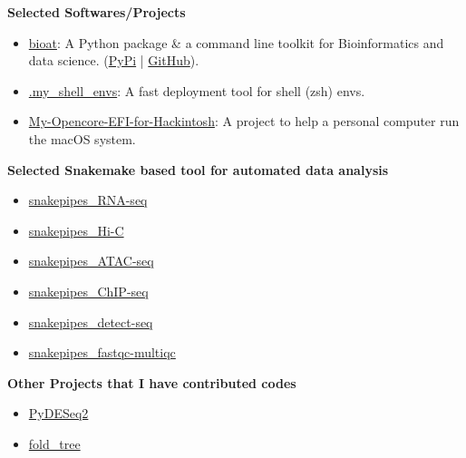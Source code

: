 \textbf{Selected Softwares/Projects}
\begin{itemize}
    \item \href{https://github.com/hermanzhaozzzz/bioat}{bioat}: A Python package \& a command line toolkit for Bioinformatics and data science. (\href{https://pypi.org/project/bioat/}{PyPi} | \href{https://github.com/hermanzhaozzzz/bioat}{GitHub}).
    \item \href{https://github.com/hermanzhaozzzz/.my_shell_envs}{.my\_shell\_envs}: A fast deployment tool for shell (zsh) envs.
    \item \href{https://github.com/hermanzhaozzzz/My-Opencore-EFI-for-AMD3900X-5700XT-TUF-x570-Hackintosh}{My-Opencore-EFI-for-Hackintosh}: A project to help a personal computer run the macOS system.
\end{itemize}

\textbf{Selected Snakemake based tool for automated data analysis}
\vspace{-1em}
\begin{multicols}{3} %
\begin{itemize}
    \item \href{https://github.com/hermanzhaozzzz/snakepipes_RNA-seq}{snakepipes\_RNA-seq}
    \item \href{https://github.com/hermanzhaozzzz/snakepipes_Hi-C}{snakepipes\_Hi-C}
\end{itemize}  
  
\columnbreak %
\begin{itemize}  
    \item \href{https://github.com/hermanzhaozzzz/snakepipes_ATAC-seq}{snakepipes\_ATAC-seq}
    \item \href{https://github.com/hermanzhaozzzz/snakepipes_ChIP-seq}{snakepipes\_ChIP-seq}
\end{itemize}  
  
\columnbreak %
\begin{itemize}  
    \item \href{https://github.com/hermanzhaozzzz/snakepipes_detect-seq}{snakepipes\_detect-seq}
    \item \href{https://github.com/hermanzhaozzzz/snakepipes_fastqc-multiqc}{snakepipes\_fastqc-multiqc}
\end{itemize}  
\end{multicols}


\textbf{Other Projects that I have contributed codes}
\vspace{-1em}
\begin{multicols}{3} %
\begin{itemize}
    \item \href{https://github.com/owkin/PyDESeq2}{PyDESeq2}
\end{itemize}
\columnbreak %
\begin{itemize}
    \item \href{https://github.com/DessimozLab/fold_tree}{fold\_tree}
\end{itemize}
\end{multicols}
\vspace{-1em}

